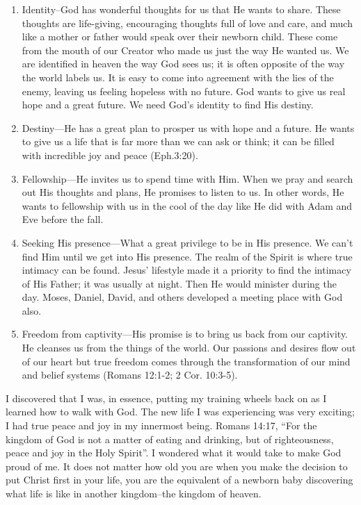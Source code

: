 \documentclass[twoside, 12pt]{book}
\begin{document}
\begin{enumerate}
	\item Identity--God has wonderful thoughts for us that He wants to share. These thoughts are life-giving, encouraging thoughts full of love and care, and much like a mother or father would speak over their newborn child. These come from the mouth of our Creator who made us just the way He wanted us. We are identified in heaven the way God sees us; it is often opposite of the way the world labels us. It is easy to come into agreement with the lies of the enemy, leaving us feeling hopeless with no future. God wants to give us real hope and a great future. We need God's identity to find His destiny.
	\item Destiny—He has a great plan to prosper us with hope and a future. He wants to give us     a life that is far more than we can ask or think; it can be filled with incredible joy and peace (Eph.3:20).
	\item Fellowship—He invites us to spend time with Him. When we pray and search out His thoughts and plans, He promises to listen to us. In other words, He wants to fellowship with us in the cool of the day like He did with Adam and Eve before the fall.
	\item Seeking His presence—What a great privilege to be in His presence. We can't find Him until we get into His presence. The realm of the Spirit is where true intimacy can be found. Jesus' lifestyle made it a priority to find the intimacy of His Father; it was usually at night. Then He would minister during the day. Moses, Daniel, David, and others developed a meeting place with God also.	
	\item Freedom from captivity—His promise is to bring us back from our captivity. He cleanses us from the things of the world. Our passions and desires flow out of our heart but true freedom comes through the transformation of our mind and belief systems (Romans 12:1-2; 2 Cor. 10:3-5).
\end{enumerate}

I discovered that I was, in essence, putting my training wheels back on as I learned how to walk with God. The new life I was experiencing was very exciting; I had true peace and joy in my innermost being. Romans 14:17, “For the kingdom of God is not a matter of eating and drinking, but of righteousness, peace and joy in the Holy Spirit”. I wondered what it would take to make God proud of me. It does not matter how old you are when you make the decision to put Christ first in your life, you are the equivalent of a newborn baby discovering what life is like in another kingdom--the kingdom of heaven.
\end{document}
